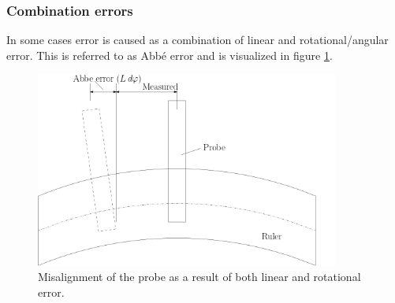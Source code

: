 \documentclass[11pt, a4paper]{article}
\numberwithin{equation}{section}
\numberwithin{figure}{section}
\begin{document}
\subsubsection{Combination errors}
In some cases error is caused as a combination of linear and rotational/angular error. This is referred to as Abbé error and is visualized in figure \ref{fig:abbe}.
\begin{figure}[H]
  \centerline{\includegraphics[width=100mm]{images/Abbe_error.png}}
  \caption{Misalignment of the probe as a result of both linear and rotational error.}
  \label{fig:abbe}
\end{figure}
\end{document}
